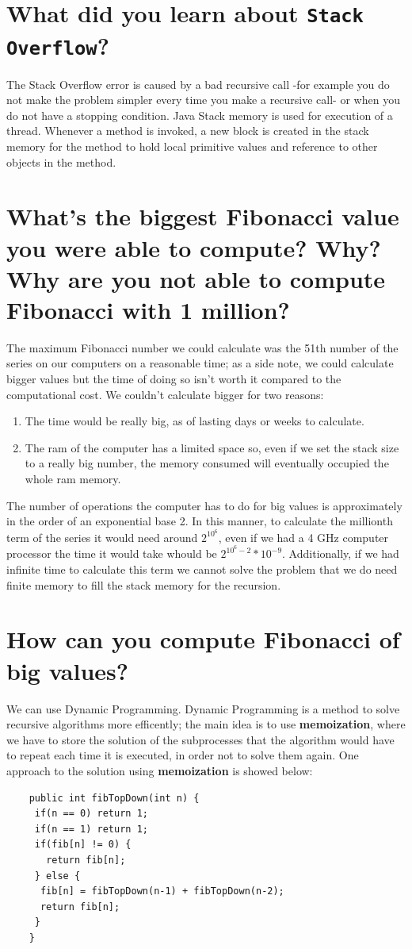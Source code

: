 \documentclass[a4paper,12pt]{article}
\begin{document}
    \section{What did you learn about \texttt{Stack Overflow}?}
      The Stack Overflow error is caused by a bad recursive call -for example you do not make
      the problem simpler every time you make a recursive call- or when you do not have a stopping
      condition.\cite{StackOverflow} Java Stack memory is used for execution of a thread.
      Whenever a method is invoked, a new block is created in the stack memory for the method to hold
      local primitive values and reference to other objects in the method.\cite{HeapStack}
    \section{What's the biggest Fibonacci value you were able to compute? Why? Why are you not able to compute Fibonacci with 1 million?}
    The maximum Fibonacci number we could calculate was the 51th number of the series on our computers on
    a reasonable time; as a side note, we could calculate bigger values but the time of doing so isn't worth
    it compared to the computational cost. We couldn't calculate bigger for two reasons:
    \begin{enumerate}
    \item The time would be really big, as of lasting days or weeks to calculate.
    \item The ram of the computer has a limited space so, even if we set the stack size to a really big
    number, the memory consumed will eventually occupied the whole ram memory.
    \end{enumerate}
    The number of operations the computer has to do for big values is approximately in the order of
    an exponential base 2. In this manner, to calculate the millionth term of the series it would need
    around $2^{10^6}$, even if we had a 4 GHz computer processor the time it would take whould be
    $2^{10^6-2}*10^{-9}$. Additionally, if we had infinite time to calculate this term we cannot solve the
    problem that we do need finite memory to fill the stack memory for the recursion.

    \section{How can you compute Fibonacci of big values?}
    We can use Dynamic Programming. Dynamic Programming is a method to solve recursive algorithms more efficently;
    the main idea is to use \textbf{memoization}, where we have to store the solution of the subprocesses that the
    algorithm would have to repeat each time it is executed, in order not to solve them again. One approach to the
    solution using \textbf{memoization} is showed below: \cite{SJ}
    \begin{Verbatim}
    public int fibTopDown(int n) {
     if(n == 0) return 1;
     if(n == 1) return 1;
     if(fib[n] != 0) {
       return fib[n];
     } else {
      fib[n] = fibTopDown(n-1) + fibTopDown(n-2);
  	  return fib[n];
     }
    }
    \end{Verbatim}
\end{document}

